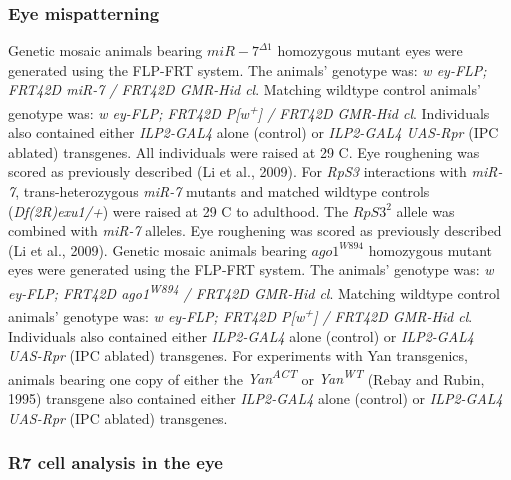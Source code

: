 \subsubsection{Eye mispatterning}

Genetic mosaic animals bearing $miR-7^{\Delta 1}$ homozygous mutant eyes were generated using the FLP-FRT system. The animals' genotype was: \textit{w ey-FLP; FRT42D miR-7\textsuperscript{} / FRT42D GMR-Hid cl}. Matching wildtype control animals' genotype was: \textit{w ey-FLP; FRT42D P{[}w\textsuperscript{+}{]} / FRT42D GMR-Hid cl}. Individuals also contained either \textit{ILP2-GAL4} alone (control) or \textit{ILP2-GAL4 UAS-Rpr} (IPC ablated) transgenes. All individuals were raised at 29 \textdegree{}C. Eye roughening was scored as previously described (Li et al., 2009). For \textit{RpS3} interactions with \textit{miR-7}, trans-heterozygous \textit{miR-7} mutants and matched wildtype controls (\textit{Df(2R)exu1/+}) were raised at 29 \textdegree{}C to adulthood. The $RpS3^2$ allele was combined with \textit{miR-7} alleles. Eye roughening was scored as previously described (Li et al., 2009). Genetic mosaic animals bearing $ago1^{W894}$ homozygous mutant eyes were generated using the FLP-FRT system. The animals' genotype was: \textit{w ey-FLP; FRT42D ago1\textsuperscript{W894} / FRT42D GMR-Hid cl}. Matching wildtype control animals' genotype was: \textit{w ey-FLP; FRT42D P{[}w\textsuperscript{+}{]} / FRT42D GMR-Hid cl}. Individuals also contained either \textit{ILP2-GAL4} alone (control) or \textit{ILP2-GAL4 UAS-Rpr} (IPC ablated) transgenes. For experiments with Yan transgenics, animals bearing one copy of either the \textit{Yan\textsuperscript{ACT}} or \textit{Yan\textsuperscript{WT}} (Rebay and Rubin, 1995) transgene also contained either \textit{ILP2-GAL4} alone (control) or \textit{ILP2-GAL4 UAS-Rpr} (IPC ablated) transgenes.

\subsubsection{R7 cell analysis in the eye}


